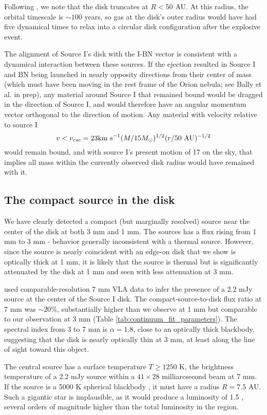 \documentclass[twocolumn]{aastex61}
\begin{document}
Following \citet{Bally2011a}, we note that the disk truncates at $R<50$
AU.  At this radius, the orbital timescale is $\sim100$ years, so gas at the
disk's outer radius would have had five dynamical times to relax into a
circular disk configuration after the explosive event.

The alignment of Source I's disk with the I-BN vector is consistent with a
dynamical interaction between these sources.  If the ejection resulted in
Source I and BN being launched in nearly opposity directions from their center
of mass (which must have been moving in the rest frame of the Orion nebula; see
Bally et al. in prep), any material around Source I that remained bound would
be dragged in the direction of Source I, and would therefore have an angular
momentum vector orthogonal to the direction of motion.  Any material with
velocity relative to source I 
$$v < v_{esc} = 23 \textrm{km~s}^{-1} (M/15M_{\odot})^{1/2}  (r/50~\mathrm{AU})^{-1/2}$$
would remain bound, and with source I's present motion of 17 \kms on the sky,
that implies all mass within the currently observed disk radius would have
remained with it.


\subsection{The compact source in the disk}
\label{sec:ptsrc}
We have clearly detected a compact (but marginally resolved) source near the
center of the disk at both 3 mm and 1 mm.  The sources has a flux rising from 1
mm to 3 mm - behavior generally inconsistent with a thermal source.  However, since the
source is nearly coincident with an edge-on disk that we show is optically
thick at 1 mm, it is likely that the source is thermal but is significantly
attenuated by the disk at 1 mm and seen with less
attenuation at 3 mm.

\citet{Reid2007a} used comparable-resolution 7 mm VLA data to infer
the presence of a 2.2 mJy source at the center of the Source I disk.
The compact-source-to-disk flux ratio at 7 mm was $\sim20\%$, substantially
higher than we observe at 1 mm but comparable to our
observation at 3 mm (Table \ref{tab:continuum_fit_parameters}).  
The spectral index from 3 to 7 mm is $\alpha=1.8$, close to an optically
thick blackbody, suggesting that the disk is nearly optically thin at 3 mm,
at least along the line of sight toward this object.

The central source has a surface temperature $T\geq1250$ K, the brightness
temperature of a 2.2 mJy source within a $41\times28$ milliarcsecond beam at 7
mm.  If the source is a 5000 K spherical blackbody \citep[e.g.,][]{Testi2010a},
it must have a radius $R=7.5$ AU.  Such a gigantic star is implausible, as it
would produce a luminosity of 1.5 \lsun, several orders of magnitude
higher than the total luminosity in the region.
\end{document}
